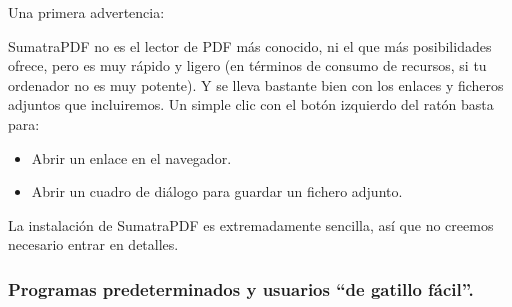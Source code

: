 \documentclass[10pt,a4paper]{article}\usepackage[]{graphicx}\usepackage[]{color}
\begin{document}
Una primera advertencia:
        \begin{center}
        \end{center}



SumatraPDF no es el lector de PDF más conocido, ni el que más posibilidades ofrece, pero es muy
rápido y ligero (en términos de consumo de recursos, si tu ordenador no es muy potente). Y se lleva
bastante bien con los enlaces y ficheros adjuntos que incluiremos. Un simple clic con el botón
izquierdo del ratón basta para:
\begin{itemize}
  \item Abrir un enlace en el navegador.
  \item Abrir un cuadro de diálogo para guardar un fichero adjunto.
\end{itemize}
La instalación de SumatraPDF es extremadamente sencilla, así que no creemos necesario entrar en
detalles.

\subsubsection{Programas predeterminados y usuarios ``de gatillo fácil''.}
\end{document}
